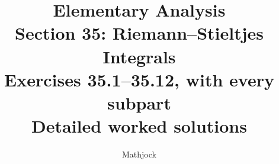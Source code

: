 
\title{\textbf{Elementary Analysis}\\[0.3em]
Section 35: Riemann--Stieltjes Integrals\\[0.4em]
\large Exercises 35.1--35.12, with every subpart\\
Detailed worked solutions}
\author{Mathjock}
\date{}

\maketitle
\bookinfo
\tableofcontents
\clearpage
\setcounter{section}{34}


